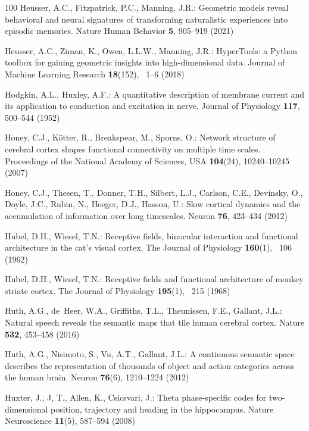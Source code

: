 \documentclass[runningheads]{llncs}
\begin{document}
\begin{thebibliography}{100}
Heusser, A.C., Fitzpatrick, P.C., Manning, J.R.: Geometric models reveal
  behavioral and neural signatures of transforming naturalistic experiences
  into episodic memories. Nature Human Behavior  \textbf{5},  905--919 (2021)

Heusser, A.C., Ziman, K., Owen, L.L.W., Manning, J.R.: {HyperTools}: a {Python}
  toolbox for gaining geometric insights into high-dimensional data. Journal of
  Machine Learning Research  \textbf{18}(152), ~1--6 (2018)

Hodgkin, A.L., Huxley, A.F.: A quantitative description of membrane current and
  its application to conduction and excitation in nerve. Journal of Physiology
  \textbf{117},  500--544 (1952)

Honey, C.J., K\"{o}tter, R., Breakspear, M., Sporns, O.: Network structure of
  cerebral cortex shapes functional connectivity on multiple time scales.
  Proceedings of the National Academy of Sciences, {USA}  \textbf{104}(24),
  10240--10245 (2007)

Honey, C.J., Thesen, T., Donner, T.H., Silbert, L.J., Carlson, C.E., Devinsky,
  O., Doyle, J.C., Rubin, N., Heeger, D.J., Hasson, U.: Slow cortical dynamics
  and the accumulation of information over long timescales. Neuron
  \textbf{76},  423--434 (2012)

Hubel, D.H., Wiesel, T.N.: Receptive fields, binocular interaction and
  functional architecture in the cat's visual cortex. The Journal of Physiology
   \textbf{160}(1), ~106 (1962)

Hubel, D.H., Wiesel, T.N.: Receptive fields and functional architecture of
  monkey striate cortex. The Journal of Physiology  \textbf{195}(1), ~215
  (1968)

Huth, A.G., de~Heer, W.A., Griffiths, T.L., Theunissen, F.E., Gallant, J.L.:
  Natural speech reveals the semantic maps that tile human cerebral cortex.
  Nature  \textbf{532},  453--458 (2016)

Huth, A.G., Nisimoto, S., Vu, A.T., Gallant, J.L.: A continuous semantic space
  describes the representation of thousands of object and action categories
  across the human brain. Neuron  \textbf{76}(6),  1210--1224 (2012)

Huxter, J., J, T., Allen, K., Csicsvari, J.: Theta phase-specific codes for
  two-dimensional position, trajectory and heading in the hippocampus. Nature
  Neuroscience  \textbf{11}(5),  587--594 (2008)


\end{thebibliography}
\end{document}
